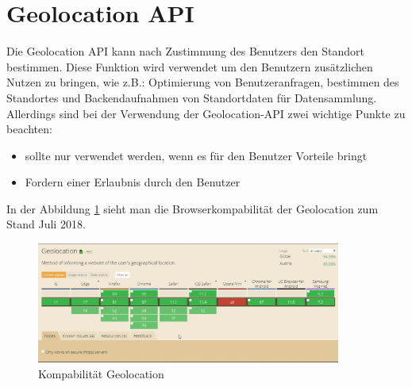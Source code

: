 \section{Geolocation API}
Die Geolocation API kann nach Zustimmung des Benutzers den Standort bestimmen. Diese Funktion wird verwendet  um den Benutzern zusätzlichen Nutzen zu bringen, wie z.B.: Optimierung von Benutzeranfragen, bestimmen des Standortes und Backendaufnahmen von Standortdaten für Datensammlung. 
Allerdings sind bei der Verwendung der Geolocation-API zwei wichtige Punkte zu beachten:

\begin{itemize}
    \item  sollte nur verwendet werden, wenn es für den Benutzer Vorteile bringt 
	\item  Fordern einer Erlaubnis durch den Benutzer  
\end{itemize}




In der Abbildung \ref{fig:BrowserGL} sieht man die Browserkompabilität der Geolocation zum Stand Juli 2018.
\begin{figure}[H]
	\centering
	\includegraphics[width=10cm]{BilderAllgemein/BrowserGL}\medskip
	\caption{Kompabilität Geolocation \cite{BrowserSupport}}
	\label{fig:BrowserGL}
\end{figure}









